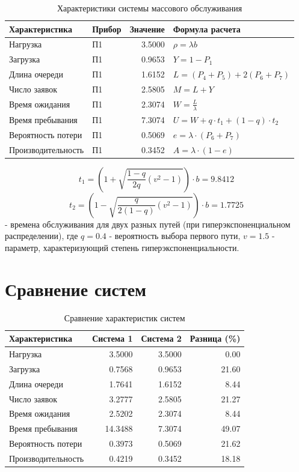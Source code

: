 \documentclass{article}
\begin{document}
\begin{table}[H]
    \centering
    \begin{tabular}{|l|l|r|l|}
    \hline
    Характеристика & Прибор & Значение & Формула расчета \\
    \hline
    Нагрузка & П1 & 3.5000 & $\rho = \lambda b$ \\
    \hline
    Загрузка & П1 & 0.9653 & $Y = 1 - P_1$ \\
    \hline
    Длина очереди & П1 & 1.6152 & $L = (P_4 + P_5) + 2(P_6 + P_7)$ \\
    \hline
    Число заявок & П1 & 2.5805 & $M = L + Y$ \\
    \hline
    Время ожидания & П1 & 2.3074 & $W = \frac{L}{\lambda}$ \\
    \hline
    Время пребывания & П1 & 7.3074 & $U = W + q\cdot t_1 + (1 - q)\cdot t_2$ \\
    \hline
    Вероятность потери & П1 & 0.5069 & $e = \lambda \cdot (P_6 + P_7)$ \\
    \hline
    Производительность & П1 & 0.3452 & $A = \lambda \cdot (1 - e)$ \\
    \hline
    \end{tabular}
    \caption{Характеристики системы массового обслуживания}
    \label{tab:queueing_system_characteristics}
\end{table}
\[t_1  = \left(1 + \sqrt{\frac{1-q}{2q}(v^2-1)}\right) \cdot b = 9.8412\]  \[t_2 = \left(1 - \sqrt{\frac{q}{2(1-q)}(v^2-1)}\right) \cdot b = 1.7725\] - времена обслуживания 
для двух разных путей (при гиперэкспоненциальном распределении), где $q = 0.4$ - вероятность выбора первого пути, $v = 1.5$ - параметр, характеризующий степень гиперэкспоненциальности.
\section{Сравнение систем}

\begin{table}[H]
    \centering
    \begin{tabular}{|l|r|r|r|}
    \hline
    Характеристика & Система 1 & Система 2 & Разница (\%) \\
    \hline
    Нагрузка & 3.5000 & 3.5000 & 0.00 \\
    Загрузка & 0.7568 & 0.9653 & 21.60 \\
    Длина очереди & 1.7641 & 1.6152 & 8.44 \\
    Число заявок & 3.2777 & 2.5805 & 21.27 \\
    Время ожидания & 2.5202 & 2.3074 & 8.44 \\
    Время пребывания & 14.3488 & 7.3074 & 49.07 \\
    Вероятность потери & 0.3973 & 0.5069 & 21.62 \\
    Производительность & 0.4219 & 0.3452 & 18.18 \\
    \hline
    \end{tabular}
    \caption{Сравнение характеристик систем}
    \label{tab:system_comparison}
\end{table}
\end{document}
